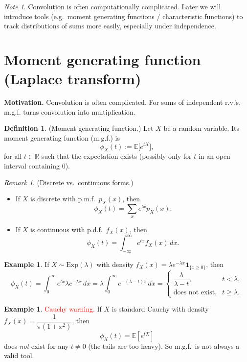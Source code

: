 \documentclass[11pt]{article}
\theoremstyle{plain}
\theoremstyle{definition}
\newtheorem{definition}[theorem]{Definition}
\newtheorem{example}[theorem]{Example}
\theoremstyle{remark}
\newtheorem{remark}[theorem]{Remark}
\newtheorem{note}[theorem]{Note}
\begin{document}
	\begin{note}
	Convolution is often computationally complicated. Later we will introduce tools (e.g.\ moment generating functions / characteristic functions) to track distributions of sums more easily, especially under independence.
	\end{note}
	
	
	\section{Moment generating function (Laplace transform)}
	
	\textbf{Motivation.}
Convolution is often complicated. For sums of independent r.v.'s, m.g.f. turns convolution into multiplication.
	
	\begin{definition}
		(Moment generating function.)
		Let \(X\) be a random variable. Its moment generating function (m.g.f.) is
		\[
		\phi_X(t):=\mathbb{E}\big[e^{tX}\big],
		\]
		for all \(t\in\mathbb{R}\) such that the expectation exists (possibly only for \(t\) in an open interval containing \(0\)).
	\end{definition}
	
	\begin{remark}
		(Discrete vs.\ continuous forms.)
		\begin{itemize}[leftmargin=2em]
			\item If \(X\) is discrete with p.m.f.\ \(p_X(x)\), then
			\[
			\phi_X(t)=\sum_x e^{tx}p_X(x).
			\]
			\item If \(X\) is continuous with p.d.f.\ \(f_X(x)\), then
			\[
			\phi_X(t)=\int_{-\infty}^{\infty} e^{tx} f_X(x)\,dx.
			\]
		\end{itemize}
	\end{remark}
	
	\begin{example}
		If \(X\sim \mathrm{Exp}(\lambda)\) with density \(f_X(x)=\lambda e^{-\lambda x}\mathbf{1}_{\{x\ge 0\}}\), then
		\[
		\phi_X(t)=\int_{0}^{\infty} e^{tx}\lambda e^{-\lambda x}\,dx
		=\lambda\int_{0}^{\infty} e^{-(\lambda-t)x}\,dx
		=
		\begin{cases}
			\dfrac{\lambda}{\lambda-t}, & t<\lambda,\\[8pt]
			\text{does not exist}, & t\ge \lambda.
		\end{cases}
		\]
	\end{example}
	
	\begin{example}
		\textcolor{red}{Cauchy warning.}
		If \(X\) is standard Cauchy with density \(f_X(x)=\dfrac{1}{\pi(1+x^2)}\), then
		\[
		\phi_X(t)=\mathbb{E}[e^{tX}]
		\]
		does \emph{not} exist for any \(t\ne 0\) (the tails are too heavy).
		So m.g.f.\ is not always a valid tool.
	\end{example}
	
\end{document}
